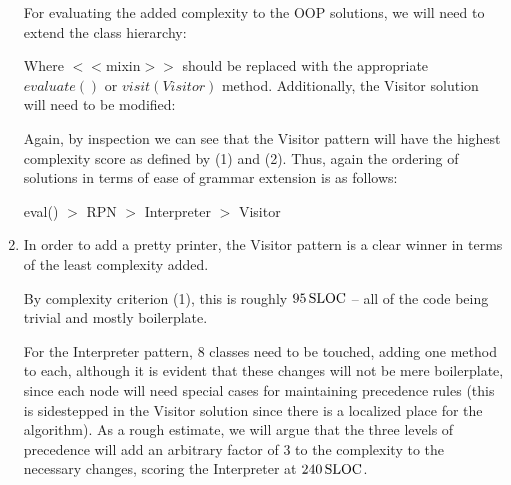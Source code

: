 \documentclass[]{article}
\begin{document}
\begin{enumerate}[label=\textbf{\alph{*})}]
For evaluating the added complexity to the OOP solutions, we will need to extend the class hierarchy:

\begin{center}
\end{center}

Where $<<$mixin$>>$ should be replaced with the appropriate $evaluate()$ or $visit(Visitor)$ method. Additionally, the Visitor solution will need to be modified:

\begin{center}
\end{center}

Again, by inspection we can see that the Visitor pattern will have the highest complexity score as defined by (1) and (2). Thus, again the ordering of solutions in terms of ease of grammar extension is as follows:

\begin{center}
eval() $>$ RPN $>$ Interpreter $>$ Visitor
\end{center}



\item In order to add a pretty printer, the Visitor pattern is a clear winner in terms of the least complexity added.

\begin{center}
\end{center}

By complexity criterion (1), this is roughly $\unit[95]{SLOC}$ -- all of the code being trivial and mostly boilerplate.

For the Interpreter pattern, 8 classes need to be touched, adding one method to each, although it is evident that these changes will not be mere boilerplate, since each node will need special cases for maintaining precedence rules (this is sidestepped in the Visitor solution since there is a localized place for the algorithm). As a rough estimate, we will argue that the three levels of precedence will add an arbitrary factor of 3 to the complexity to the necessary changes, scoring the Interpreter at $\unit[240]{SLOC}$.


\end{enumerate}
\end{document}
